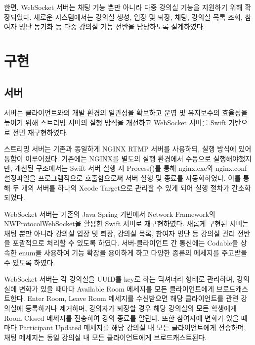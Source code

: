 \documentclass[10pt, a4paper, oneside]{article}
\begin{document}
한편, WebSocket 서버는 채팅 기능 뿐만 아니라 다중 강의실 기능을 지원하기 위해 확장되었다. 새로운 시스템에서는 강의실 생성, 입장 및 퇴장, 채팅, 강의실 목록 조회, 참여자 명단 동기화 등 다중 강의실 기능 전반을 담당하도록 설계하였다.

\section{구현}
\subsection{서버}
서버는 클라이언트와의 개발 환경의 일관성을 확보하고 운영 및 유지보수의 효율성을 높이기 위해 스트리밍 서버의 실행 방식을 개선하고 WebSocket 서버를 Swift 기반으로 전면 재구현하였다.

스트리밍 서버는 기존과 동일하게 NGINX RTMP 서버를 사용하되, 실행 방식에 있어 통합이 이루어졌다. 기존에는 NGINX를 별도의 실행 환경에서 수동으로 실행해야했지만, 개선된 구조에서는 Swift 서버 실행 시 Process()를 통해 nginx.exe와 nginx.conf 설정파일을 프로그램적으로 호출함으로써 서버 실행 및 종료를 자동화하였다. 이를 통해 두 개의 서버를 하나의 Xcode Target으로 관리할 수 있게 되어 실행 절차가 간소화되었다.

WebSocket 서버는 기존의 Java Spring 기반에서 Network Framework\cite{Network}의 NWProtocolWebSocket을 활용한 Swift 서버로 재구현하였다. 새롭게 구현된 서버는 채팅 뿐만 아니라 강의실 입장 및 퇴장, 강의실 목록, 참여자 명단 등 강의실 관리 전반을 포괄적으로 처리할 수 있도록 하였다. 서버-클라이언트 간 통신에는 Codable을 상속한 enum을 사용하여 기능 확장을 용이하게 하고 다양한 종류의 메세지를 주고받을 수 있도록 하였다.

WebSocket 서버는 각 강의실을 UUID를 key로 하는 딕셔너리 형태로 관리하며, 강의실에 변화가 있을 때마다 Available Room 메세지를 모든 클라이언트에게 브로드캐스트한다. Enter Room, Leave Room 메세지를 수신받으면 해당 클라이언트를 관련 강의실에 등록하거나 제거하며, 강의자가 퇴장할 경우 해당 강의실의 모든 학생에게 Room Closed 메세지를 전송하여 강의 종료를 알린다. 또한 참여자에 변화가 있을 때마다 Participant Updated 메세지를 해당 강의실 내 모든 클라이언트에게 전송하며, 채팅 메세지는 동일 강의실 내 모든 클라이언트에게 브로드캐스트된다.
\end{document}
